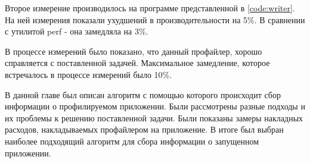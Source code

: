     Второе измерение производилось на программе представленной в \ref{code:writer}. На ней измерения показали ухудшений в производительности на 5\%. В сравнении с утилитой perf - она замедляла на 3\%.
    
    В процессе измерений было показано, что данный профайлер, хорошо справляется с поставленной задачей. Максимальное замедление, которое встречалось в процессе измерений было 10\%. 
        
\chapterconclusion
	В данной главе был описан алгоритм с помощью которого происходит сбор информации о профилируемом приложении. Были рассмотрены разные подходы и их проблемы к решению поставленной задачи. Были показаны замеры накладных расходов, накладываемых профайлером на приложение. В итоге был выбран наиболее подходящий алгоритм для сбора информации о запущенном приложении.